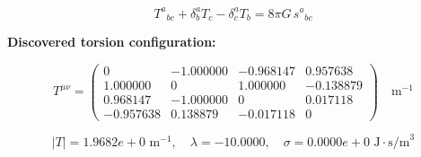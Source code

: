 
\begin{equation}
  T^a{}_{bc} + \delta^a_b T_c - \delta^a_c T_b = 8\pi G \, s^a{}_{bc}
\end{equation}

\textbf{Discovered torsion configuration:}

\begin{equation}
  T^{\mu\nu} = \begin{pmatrix}
    0 & -1.000000 & -0.968147 & 0.957638 \\
    1.000000 & 0 & 1.000000 & -0.138879 \\
    0.968147 & -1.000000 & 0 & 0.017118 \\
    -0.957638 & 0.138879 & -0.017118 & 0
  \end{pmatrix} \quad \text{m}^{-1}
\end{equation}

\begin{equation}
  |T| = 1.9682e+0 \text{ m}^{-1}, \quad
  \lambda = -10.0000, \quad
  \sigma = 0.0000e+0 \text{ J}\cdot\text{s/m}^3
\end{equation}
